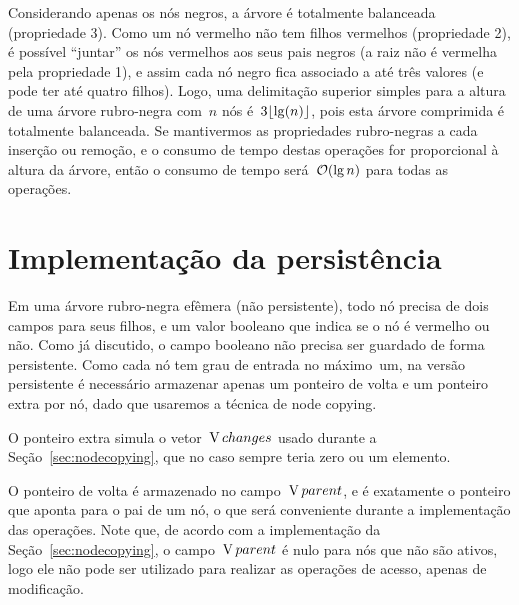 \documentclass[main.tex]{subfiles}
\begin{document}
Considerando apenas os nós negros, a árvore é totalmente balanceada (propriedade 3). Como um nó vermelho não tem filhos vermelhos (propriedade 2), é possível ``juntar'' os nós vermelhos aos seus pais negros (a raiz não é vermelha pela propriedade 1), e assim cada nó negro fica associado a até três valores (e pode ter até quatro filhos). Logo, uma delimitação superior simples para a altura de uma árvore rubro-negra com~$n$ nós é~$3\lfloor\lg(n)\rfloor$, pois esta árvore comprimida é totalmente balanceada. Se mantivermos as propriedades rubro-negras a cada inserção ou remoção, e o consumo de tempo destas operações for proporcional à altura da árvore, então o consumo de tempo será~$\mathcal{O}(\lg n)$ para todas as operações.

\section{Implementação da persistência}

\newcommand{\ts}{\mathcal{T}}
\newcommand{\cp}{\V{copy}}
\newcommand{\child}{\V{child}}
\newcommand{\parent}{\V{parent}}
\newcommand{\red}{\V{red}}
\newcommand{\extra}{\V{extra}}
\newcommand{\eSide}{\V{extraSide}}
\newcommand{\eTs}{\V{extra\mathcal{T}}}
\newcommand{\version}{\V{version}}
\newcommand{\side}{\V{side}}
\newcommand{\roots}{\V{roots}}
\newcommand{\val}{\V{value}}
\newcommand{\cur}{\V{current}}


Em uma árvore rubro-negra efêmera (não persistente), todo nó precisa de dois campos para seus filhos, e um valor booleano que indica se o nó é vermelho ou não. Como já discutido, o campo booleano não precisa ser guardado de forma persistente. Como cada nó tem grau de entrada no máximo~um, na versão persistente é necessário armazenar apenas um ponteiro de volta e um ponteiro extra por nó, dado que usaremos a técnica de node copying.

O ponteiro extra simula o vetor~$\operatorname{V}{changes}$ usado durante a Seção~\ref{sec:nodecopying}, que no caso sempre teria zero ou um elemento.

O ponteiro de volta é armazenado no campo~$\parent$, e é exatamente o ponteiro que aponta para o pai de um nó, o que será conveniente durante a implementação das operações. Note que, de acordo com a implementação da Seção~\ref{sec:nodecopying}, o campo~$\parent$ é nulo para nós que não são ativos, logo ele não pode ser utilizado para realizar as operações de acesso, apenas de modificação.
\end{document}
